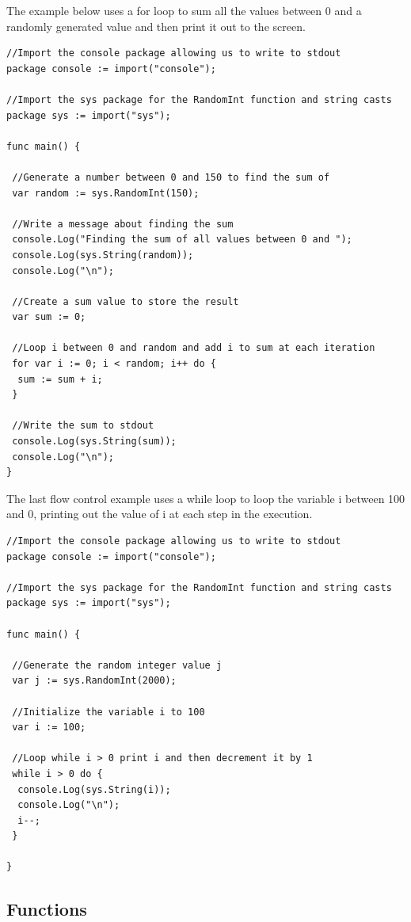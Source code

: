 \documentclass[]{final_report}
\begin{document}
The example below uses a for loop to sum all the values between 0 and a randomly generated value and then print it out to the screen.

\begin{verbatim}
//Import the console package allowing us to write to stdout
package console := import("console");

//Import the sys package for the RandomInt function and string casts
package sys := import("sys");

func main() {

 //Generate a number between 0 and 150 to find the sum of
 var random := sys.RandomInt(150);

 //Write a message about finding the sum
 console.Log("Finding the sum of all values between 0 and ");
 console.Log(sys.String(random));
 console.Log("\n");
 
 //Create a sum value to store the result
 var sum := 0;
 
 //Loop i between 0 and random and add i to sum at each iteration
 for var i := 0; i < random; i++ do {
  sum := sum + i;
 }  
 
 //Write the sum to stdout
 console.Log(sys.String(sum));
 console.Log("\n"); 
}
\end{verbatim}

The last flow control example uses a while loop to loop the variable i between 100 and 0, printing out the value of i at each step in the execution.

\begin{verbatim}
//Import the console package allowing us to write to stdout
package console := import("console");

//Import the sys package for the RandomInt function and string casts
package sys := import("sys");

func main() {

 //Generate the random integer value j
 var j := sys.RandomInt(2000);

 //Initialize the variable i to 100
 var i := 100;

 //Loop while i > 0 print i and then decrement it by 1
 while i > 0 do {
  console.Log(sys.String(i));
  console.Log("\n");
  i--;
 }

}
\end{verbatim}

\subsection{Functions}
\end{document}
